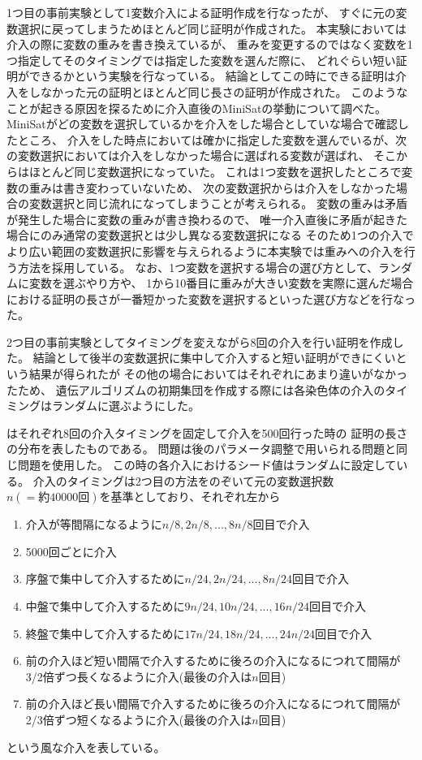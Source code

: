 1つ目の事前実験として1変数介入による証明作成を行なったが、
すぐに元の変数選択に戻ってしまうためほとんど同じ証明が作成された。
本実験においては介入の際に変数の重みを書き換えているが、
重みを変更するのではなく変数を1つ指定してそのタイミングでは指定した変数を選んだ際に、
どれぐらい短い証明ができるかという実験を行なっている。
結論としてこの時にできる証明は介入をしなかった元の証明とほとんど同じ長さの証明が作成された。
このようなことが起きる原因を探るために介入直後のMiniSatの挙動について調べた。
MiniSatがどの変数を選択しているかを介入をした場合としていな場合で確認したところ、
介入をした時点においては確かに指定した変数を選んでいるが、次の変数選択においては介入をしなかった場合に選ばれる変数が選ばれ、
そこからはほとんど同じ変数選択になっていた。
これは1つ変数を選択したところで変数の重みは書き変わっていないため、
次の変数選択からは介入をしなかった場合の変数選択と同じ流れになってしまうことが考えられる。
変数の重みは矛盾が発生した場合に変数の重みが書き換わるので、
唯一介入直後に矛盾が起きた場合にのみ通常の変数選択とは少し異なる変数選択になる
そのため1つの介入でより広い範囲の変数選択に影響を与えられるように本実験では重みへの介入を行う方法を採用している。
なお、1つ変数を選択する場合の選び方として、ランダムに変数を選ぶやり方や、
1から10番目に重みが大きい変数を実際に選んだ場合における証明の長さが一番短かった変数を選択するといった選び方などを行なった。


2つ目の事前実験としてタイミングを変えながら8回の介入を行い証明を作成した。
結論として後半の変数選択に集中して介入すると短い証明ができにくいという結果が得られたが
その他の場合においてはそれぞれにあまり違いがなかったため、
遺伝アルゴリズムの初期集団を作成する際には各染色体の介入のタイミングはランダムに選ぶようにした。


はそれぞれ8回の介入タイミングを固定して介入を500回行った時の
証明の長さの分布を表したものである。
問題は後のパラメータ調整で用いられる問題と同じ問題を使用した。
この時の各介入におけるシード値はランダムに設定している。
介入のタイミングは2つ目の方法をのぞいて元の変数選択数$n(={約}40000{回})$を基準としており、それぞれ左から
\begin{enumerate}
    \item 介入が等間隔になるように$n/8, 2n/8, ..., 8n/8$回目で介入
    \item 5000回ごとに介入
    \item 序盤で集中して介入するために$n/24, 2n/24, ... , 8n/24$回目で介入
    \item 中盤で集中して介入するために$9n/24, 10n/24, ... , 16n/24$回目で介入
    \item 終盤で集中して介入するために$17n/24, 18n/24, ... , 24n/24$回目で介入
    \item 前の介入ほど短い間隔で介入するために後ろの介入になるにつれて間隔が3/2倍ずつ長くなるように介入(最後の介入は$n$回目)
    \item 前の介入ほど長い間隔で介入するために後ろの介入になるにつれて間隔が2/3倍ずつ短くなるように介入(最後の介入は$n$回目)
\end{enumerate}
という風な介入を表している。

